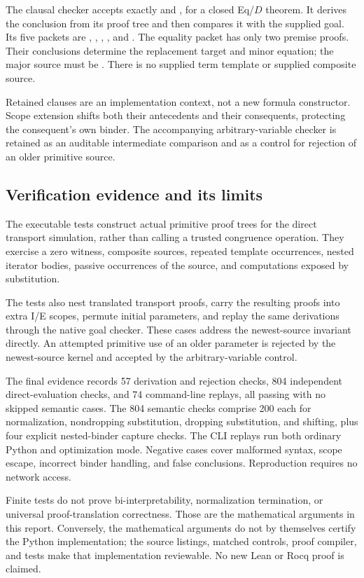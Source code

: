 The clausal checker accepts exactly  and , for a
closed Eq/$D$ theorem. It derives the conclusion from its proof tree and
then compares it with the supplied goal. Its five packets are
, , , , and .
The equality packet \code{["x",p,q]} has only two premise proofs.
Their conclusions determine the replacement target and minor equation;
the major source must be \code{["v",0]}.
There is no supplied term template or supplied composite source.

Retained clauses are an implementation context, not a new formula
constructor. Scope extension shifts both their antecedents and their
consequents, protecting the consequent's own binder. The accompanying
arbitrary-variable checker is retained as an auditable intermediate
comparison and as a control for rejection of an older primitive source.

\subsection{Verification evidence and its limits}

The executable tests construct actual primitive proof trees for the
direct transport simulation, rather than calling a trusted congruence
operation. They exercise a zero witness, composite sources, repeated
template occurrences, nested iterator bodies, passive occurrences of
the source, and computations exposed by substitution.

The tests also nest translated transport proofs, carry the resulting
proofs into extra I/E scopes, permute initial parameters, and replay the
same derivations through the native goal checker. These cases address
the newest-source invariant directly. An attempted primitive use of an
older parameter is rejected by the newest-source kernel and accepted
by the arbitrary-variable control.

The final evidence records 57 derivation and rejection checks, 804
independent direct-evaluation checks, and 74 command-line replays, all
passing with no skipped semantic cases. The 804 semantic checks comprise
200 each for normalization, nondropping substitution, dropping substitution,
and shifting, plus four explicit nested-binder capture checks. The CLI
replays run both ordinary Python and optimization mode. Negative cases
cover malformed syntax, scope escape, incorrect binder handling, and false
conclusions. Reproduction requires no network access.

Finite tests do not prove bi-interpretability, normalization termination,
or universal proof-translation correctness. Those are the mathematical
arguments in this report. Conversely, the mathematical arguments do not
by themselves certify the Python implementation; the source listings,
matched controls, proof compiler, and tests make that implementation
reviewable. No new Lean or Rocq proof is claimed.

